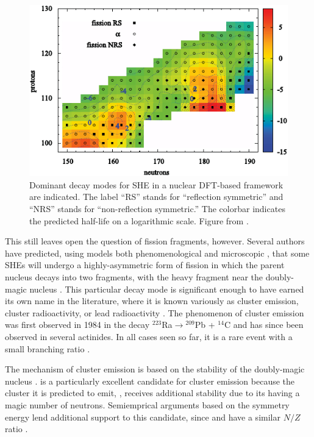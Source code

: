 \begin{figure}
	\centering
	\includegraphics[width=0.7\linewidth]{TeX_files/294Og_Warda2012_SHE}
	\caption[Dominant decay modes for SHE in a nuclear DFT-based framework.]{Dominant decay modes for SHE in a nuclear DFT-based framework are indicated. The label ``RS'' stands for ``reflection symmetric'' and ``NRS'' stands for ``non-reflection symmetric.'' The colorbar indicates the predicted half-life on a logarithmic scale. Figure from \cite{Warda2012}.}
	\label{fig:warda2012she}
\end{figure}

This still leaves open the question of fission fragments, however. Several authors have predicted, using models both phenomenological \cite{Poenaru2011, Poenaru2012, Poenaru2013, Poenaru2015, Poenaru2018,Santhosh2018, Zhang2018} and microscopic \cite{Warda2018}, that some SHEs will undergo a highly-asymmetric form of fission in which the parent nucleus decays into two fragments, with the heavy fragment near the doubly-magic nucleus {\Pb}. This particular decay mode is significant enough to have earned its own name in the literature, where it is known variously as cluster emission, cluster radioactivity, or lead radioactivity \cite{Sandulescu1980,Poenaru1986,Royer1998,Poenaru2010,Warda2011}. The phenomenon of cluster emission was first observed in 1984 in the decay $^{223}$Ra$\rightarrow$$^{209}$Pb + $^{14}$C \cite{Rose1984} and has since been observed in several actinides. In all cases seen so far, it is a rare event with a small branching ratio \cite{Poenaru2010}.

The mechanism of cluster emission is based on the stability of the doubly-magic nucleus {\Pb}. {\Og} is a particularly excellent candidate for cluster emission because the cluster it is predicted to emit, {\Kr}, receives additional stability due to its having a magic number of neutrons.  Semiemprical arguments based on the symmetry energy lend additional support to this candidate, since {\Og} and {\Pb} have a similar $N/Z$ ratio \cite{Warda2018}.

